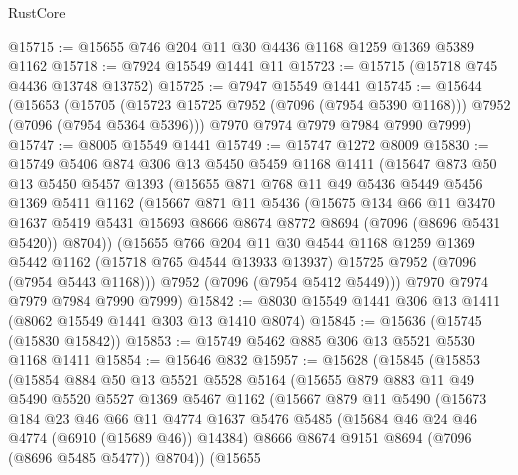 \begin{lexlean}{RustCore}
\begin{coremodule}
@15715 := @15655 @746 @204 @11 @30 @4436 @1168 @1259 @1369 @5389 @1162
@15718 := @7924 @15549 @1441 @11
@15723 := @15715 (@15718 @745 @4436 @13748 @13752)
@15725 := @7947 @15549 @1441
@15745 := @15644
    (@15653
      (@15705 (@15723 @15725 @7952 (@7096 (@7954 @5390 @1168))) @7952 (@7096 (@7954 @5364 @5396)))
      @7970
      @7974
      @7979
      @7984
      @7990
      @7999)
@15747 := @8005 @15549 @1441
@15749 := @15747 @1272 @8009
@15830 := @15749
    @5406
    @874
    @306
    @13
    @5450
    @5459
    @1168
    @1411
    (@15647
      @873
      @50
      @13
      @5450
      @5457
      @1393
      (@15655
        @871
        @768
        @11
        @49
        @5436
        @5449
        @5456
        @1369
        @5411
        @1162
        (@15667
          @871
          @11
          @5436
          (@15675
            @134
            @66
            @11
            @3470
            @1637
            @5419
            @5431
            @15693
            @8666
            @8674
            @8772
            @8694
            (@7096 (@8696 @5431 @5420))
            @8704))
        (@15655
          @766
          @204
          @11
          @30
          @4544
          @1168
          @1259
          @1369
          @5442
          @1162
          (@15718 @765 @4544 @13933 @13937)
          @15725
          @7952
          (@7096 (@7954 @5443 @1168)))
        @7952
        (@7096 (@7954 @5412 @5449)))
      @7970
      @7974
      @7979
      @7984
      @7990
      @7999)
@15842 := @8030 @15549 @1441 @306 @13 @1411 (@8062 @15549 @1441 @303 @13 @1410 @8074)
@15845 := @15636 (@15745 (@15830 @15842))
@15853 := @15749 @5462 @885 @306 @13 @5521 @5530 @1168 @1411
@15854 := @15646 @832
@15957 := @15628
    (@15845
      (@15853
        (@15854
          @884
          @50
          @13
          @5521
          @5528
          @5164
          (@15655
            @879
            @883
            @11
            @49
            @5490
            @5520
            @5527
            @1369
            @5467
            @1162
            (@15667
              @879
              @11
              @5490
              (@15673
                @184
                @23
                @46
                @66
                @11
                @4774
                @1637
                @5476
                @5485
                (@15684 @46 @24 @46 @4774 (@6910 (@15689 @46)) @14384)
                @8666
                @8674
                @9151
                @8694
                (@7096 (@8696 @5485 @5477))
                @8704))
            (@15655

\end{coremodule}
\end{lexlean}
